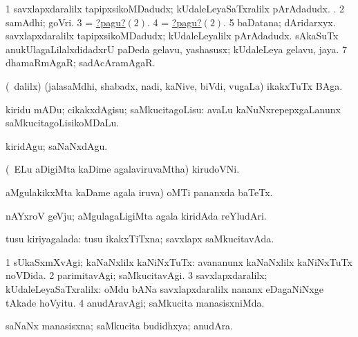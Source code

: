 \noindent
\gl{\pagu}
\bmng
\bnum
\num{1}  savxlapxdaralilx tapipxsikoMDadudx; kUdaleLeyaSaTxralilx pArAdadudx. 
\hypertarget{narrow1pagu2}{}. 
\num{2}  samAdhi; goVri. 
\num{3}  = \hyperlink{narrow1pagu2}{?pagu?\((2)\)}. 
\num{4}  = \hyperlink{narrow1pagu2}{?pagu?\((2)\)}. 
\num{5}  baDatana; dAridarxyx. 
  
\banum
{} savxlapxdaralilx tapipxsikoMDadudx; kUdaleLeyalilx pArAdadudx. 
 sAkaSuTx anukUlagaLilalxdidadxrU paDeda gelavu, yashasusx; kUdaleLeya gelavu, jaya. 
\eanum
\numie
\num{7}  dhamaRmAgaR; sadAcAramAgaR. 
\enum
\emng
\eentry

\bentry
{}
\gl{\nA}
\bmng
(\sA\ \bava dalilx) (jalasaMdhi, shabadx, nadi, kaNive, biVdi, \mo vugaLa) ikakxTuTx BAga. 
\emng
\eentry

\bentry
{}
\gl{\sakirx}
\bmng
kiridu mADu; cikakxdAgisu; saMkucitagoLisu:  avaLu kaNuNxrepepxgaLanunx saMkucitagoLisikoMDaLu. 
\emng

\noindent
\gl{\akirx}
\bmng
kiridAgu; saNaNxdAgu. 
\emng
\eentry

\bentry
{}
\gl{\nA}
\bmng
(\kanmu\ ELu aDigiMta kaDime agalaviruvaMtha) kirudoVNi. 
\emng
\eentry

\bentry
{}
\gl{\nA}
\bmng
{} aMgulakikxMta kaDame agala iruva) oMTi pananxda baTeTx. 
\emng
\eentry

\bentry
{}
\gl{\nA}
\bmng
nAYxroV geVju;  aMgulagaLigiMta agala kiridAda reYludAri. 
\emng
\eentry

\bentry
{}
\gl{\gu}
\bmng
tusu kiriyagalada: tusu ikakxTiTxna; savxlapx saMkucitavAda. 
\emng
\eentry

\bentry
{}
\gl{\kirxvi}
\bmng
\bnum
\num{1} sUkaSxmXvAgi; kaNaNxlilx kaNiNxTuTx:  avananunx kaNaNxlilx kaNiNxTuTx noVDida. 
\num{2} parimitavAgi; saMkucitavAgi. 
\num{3} savxlapxdaralilx; kUdaleLeyaSaTxralilx:  oMdu bANa savxlapxdaralilx nananx eDagaNiNxge tAkade hoVyitu. 
\num{4} anudAravAgi; saMkucita manasisxniMda. 
\enum
\emng
\eentry

\bentry
{}
\gl{\gu}
\bmng
saNaNx manasisxna; saMkucita budidhxya; anudAra. 
\emng
\eentry

